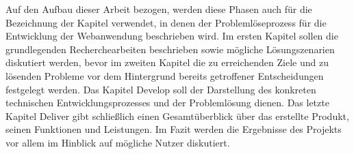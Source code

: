   Auf den Aufbau dieser Arbeit bezogen, werden diese Phasen auch für die Bezeichnung der Kapitel verwendet, in denen der Problemlöseprozess für die Entwicklung der Webanwendung beschrieben wird. Im ersten Kapitel sollen die grundlegenden Recherchearbeiten beschrieben sowie mögliche Lösungszenarien diskutiert werden, bevor im zweiten Kapitel die zu erreichenden Ziele und zu lösenden Probleme vor dem Hintergrund bereits getroffener Entscheidungen festgelegt werden. Das Kapitel Develop soll der Darstellung des konkreten technischen Entwicklungsprozesses und der Problemlösung dienen. Das letzte Kapitel Deliver gibt schließlich einen Gesamtüberblick über das erstellte Produkt, seinen Funktionen und Leistungen. Im Fazit werden die Ergebnisse des Projekts vor allem im Hinblick auf mögliche Nutzer diskutiert.

